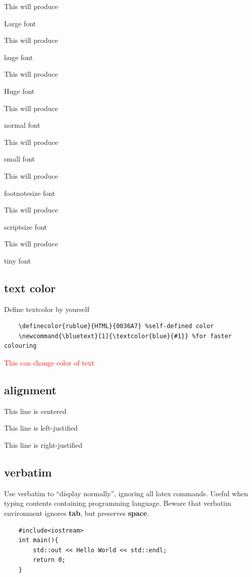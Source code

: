 \documentclass[12pt,a4paper]{article}
\begin{document}
This will produce \begin{Large}Large font\end{Large}

This will produce \begin{huge}huge font\end{huge}

This will produce \begin{Huge}Huge font\end{Huge}

This will produce \begin{normalsize}normal font\end{normalsize}

This will produce \begin{small}small font\end{small}

This will produce \begin{footnotesize}footnotesize font\end{footnotesize}

This will produce \begin{scriptsize}scriptsize font\end{scriptsize}

This will produce \begin{tiny}tiny font\end{tiny}
\subsection{text color}
Define textcolor by yourself
\begin{verbatim}
	\definecolor{rublue}{HTML}{0036A7} %self-defined color
	\newcommand{\bluetext}[1]{\textcolor{blue}{#1}} %for faster colouring
\end{verbatim}
\textcolor{red}{This can change color of text} %
\subsection{alignment}
\begin{center}
	This line is centered
\end{center}

\begin{flushleft}
	This line is left-justified
\end{flushleft}

\begin{flushright}
	This line is right-justified
\end{flushright}
\subsection{verbatim}
Use verbatim to ``display normally'', ignoring all latex commands. Useful when typing contents containing programming language. Beware that verbatim environment ignores \textbf{tab}, but preserves \textbf{space}.
\begin{verbatim}
	#include<iostream>
	int main(){
		std::out << Hello World << std::endl;
		return 0;
	}
\end{verbatim}
\end{document}
